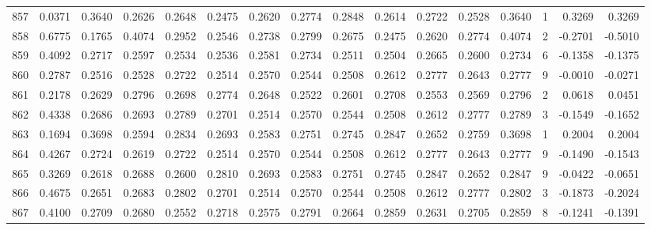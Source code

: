 \begin{tabular}{lrrrrrrrrrrrrrrr}
857 &      0.0371 &  0.3640 &  0.2626 &  0.2648 &  0.2475 &  0.2620 &  0.2774 &  0.2848 &  0.2614 &  0.2722 &   0.2528 &     0.3640 &      1 &                    0.3269 &                     0.3269 \\
858 &      0.6775 &  0.1765 &  0.4074 &  0.2952 &  0.2546 &  0.2738 &  0.2799 &  0.2675 &  0.2475 &  0.2620 &   0.2774 &     0.4074 &      2 &                   -0.2701 &                    -0.5010 \\
859 &      0.4092 &  0.2717 &  0.2597 &  0.2534 &  0.2536 &  0.2581 &  0.2734 &  0.2511 &  0.2504 &  0.2665 &   0.2600 &     0.2734 &      6 &                   -0.1358 &                    -0.1375 \\
860 &      0.2787 &  0.2516 &  0.2528 &  0.2722 &  0.2514 &  0.2570 &  0.2544 &  0.2508 &  0.2612 &  0.2777 &   0.2643 &     0.2777 &      9 &                   -0.0010 &                    -0.0271 \\
861 &      0.2178 &  0.2629 &  0.2796 &  0.2698 &  0.2774 &  0.2648 &  0.2522 &  0.2601 &  0.2708 &  0.2553 &   0.2569 &     0.2796 &      2 &                    0.0618 &                     0.0451 \\
862 &      0.4338 &  0.2686 &  0.2693 &  0.2789 &  0.2701 &  0.2514 &  0.2570 &  0.2544 &  0.2508 &  0.2612 &   0.2777 &     0.2789 &      3 &                   -0.1549 &                    -0.1652 \\
863 &      0.1694 &  0.3698 &  0.2594 &  0.2834 &  0.2693 &  0.2583 &  0.2751 &  0.2745 &  0.2847 &  0.2652 &   0.2759 &     0.3698 &      1 &                    0.2004 &                     0.2004 \\
864 &      0.4267 &  0.2724 &  0.2619 &  0.2722 &  0.2514 &  0.2570 &  0.2544 &  0.2508 &  0.2612 &  0.2777 &   0.2643 &     0.2777 &      9 &                   -0.1490 &                    -0.1543 \\
865 &      0.3269 &  0.2618 &  0.2688 &  0.2600 &  0.2810 &  0.2693 &  0.2583 &  0.2751 &  0.2745 &  0.2847 &   0.2652 &     0.2847 &      9 &                   -0.0422 &                    -0.0651 \\
866 &      0.4675 &  0.2651 &  0.2683 &  0.2802 &  0.2701 &  0.2514 &  0.2570 &  0.2544 &  0.2508 &  0.2612 &   0.2777 &     0.2802 &      3 &                   -0.1873 &                    -0.2024 \\
867 &      0.4100 &  0.2709 &  0.2680 &  0.2552 &  0.2718 &  0.2575 &  0.2791 &  0.2664 &  0.2859 &  0.2631 &   0.2705 &     0.2859 &      8 &                   -0.1241 &                    -0.1391 \\

\end{tabular}
